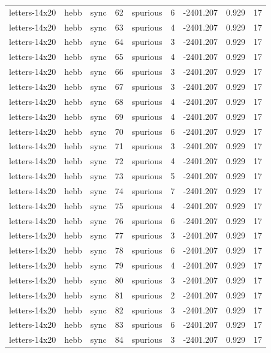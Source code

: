 \begin{tabular}{lllrlrrrr}
letters-14x20 & hebb & sync & 62 & spurious & 6 & -2401.207 & 0.929 & 17 \\
letters-14x20 & hebb & sync & 63 & spurious & 4 & -2401.207 & 0.929 & 17 \\
letters-14x20 & hebb & sync & 64 & spurious & 3 & -2401.207 & 0.929 & 17 \\
letters-14x20 & hebb & sync & 65 & spurious & 4 & -2401.207 & 0.929 & 17 \\
letters-14x20 & hebb & sync & 66 & spurious & 3 & -2401.207 & 0.929 & 17 \\
letters-14x20 & hebb & sync & 67 & spurious & 3 & -2401.207 & 0.929 & 17 \\
letters-14x20 & hebb & sync & 68 & spurious & 4 & -2401.207 & 0.929 & 17 \\
letters-14x20 & hebb & sync & 69 & spurious & 4 & -2401.207 & 0.929 & 17 \\
letters-14x20 & hebb & sync & 70 & spurious & 6 & -2401.207 & 0.929 & 17 \\
letters-14x20 & hebb & sync & 71 & spurious & 3 & -2401.207 & 0.929 & 17 \\
letters-14x20 & hebb & sync & 72 & spurious & 4 & -2401.207 & 0.929 & 17 \\
letters-14x20 & hebb & sync & 73 & spurious & 5 & -2401.207 & 0.929 & 17 \\
letters-14x20 & hebb & sync & 74 & spurious & 7 & -2401.207 & 0.929 & 17 \\
letters-14x20 & hebb & sync & 75 & spurious & 4 & -2401.207 & 0.929 & 17 \\
letters-14x20 & hebb & sync & 76 & spurious & 6 & -2401.207 & 0.929 & 17 \\
letters-14x20 & hebb & sync & 77 & spurious & 3 & -2401.207 & 0.929 & 17 \\
letters-14x20 & hebb & sync & 78 & spurious & 6 & -2401.207 & 0.929 & 17 \\
letters-14x20 & hebb & sync & 79 & spurious & 4 & -2401.207 & 0.929 & 17 \\
letters-14x20 & hebb & sync & 80 & spurious & 3 & -2401.207 & 0.929 & 17 \\
letters-14x20 & hebb & sync & 81 & spurious & 2 & -2401.207 & 0.929 & 17 \\
letters-14x20 & hebb & sync & 82 & spurious & 3 & -2401.207 & 0.929 & 17 \\
letters-14x20 & hebb & sync & 83 & spurious & 6 & -2401.207 & 0.929 & 17 \\
letters-14x20 & hebb & sync & 84 & spurious & 3 & -2401.207 & 0.929 & 17 \\

\end{tabular}

